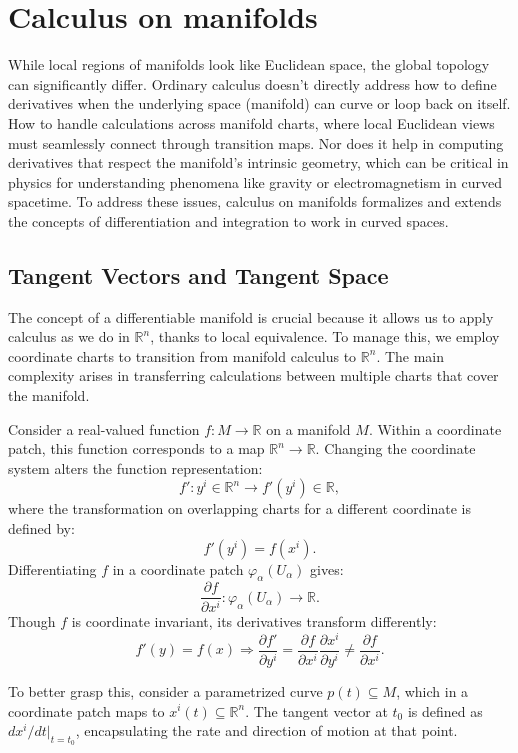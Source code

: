 \documentclass{article}
\begin{document}
\section{Calculus on manifolds}

While local regions of manifolds look like Euclidean space, the global topology can significantly differ. Ordinary calculus doesn't directly address how to define derivatives when the underlying space (manifold) can curve or loop back on itself.
How to handle calculations across manifold charts, where local Euclidean views must seamlessly connect through transition maps. Nor does it help in computing derivatives that respect the manifold's intrinsic geometry, which can be critical in physics for understanding phenomena like gravity or electromagnetism in curved spacetime. To address these issues, calculus on manifolds formalizes and extends the concepts of differentiation and integration to work in curved spaces. 

\subsection{Tangent Vectors and Tangent Space} 

The concept of a differentiable manifold is crucial because it allows us to apply calculus as we do in $\mathbb{R}^n$, thanks to local equivalence. To manage this, we employ coordinate charts to transition from manifold calculus to $\mathbb{R}^n$. The main complexity arises in transferring calculations between multiple charts that cover the manifold.

Consider a real-valued function $f : M \rightarrow \mathbb{R}$ on a manifold $M$. Within a coordinate patch, this function corresponds to a map $\mathbb{R}^n \rightarrow \mathbb{R}$. Changing the coordinate system alters the function representation:
\[
f' : y^i \in \mathbb{R}^n \rightarrow f'(y^i) \in \mathbb{R},
\]
where the transformation on overlapping charts for a different coordinate is defined by:
\[
f'(y^i) = f(x^i).
\]
Differentiating $f$ in a coordinate patch $\varphi_\alpha(U_\alpha)$ gives:
\[
\frac{\partial f}{\partial x^i} : \varphi_\alpha(U_\alpha) \rightarrow \mathbb{R}.
\]
Though $f$ is coordinate invariant, its derivatives transform differently:
\[
f'(y) = f(x) \Rightarrow \frac{\partial f'}{\partial y^i} = \frac{\partial f}{\partial x^i} \frac{\partial x^i}{\partial y^i} \neq \frac{\partial f}{\partial x^i}.
\]

To better grasp this, consider a parametrized curve $p(t) \subseteq M$, which in a coordinate patch maps to $x^i(t) \subseteq \mathbb{R}^n$. The tangent vector at $t_0$ is defined as $dx^i/dt |_{t=t_0}$, encapsulating the rate and direction of motion at that point. 
\end{document}
